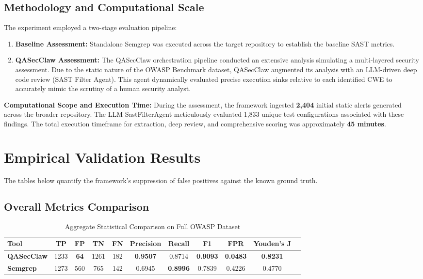\documentclass[11pt,a4paper]{article}
\begin{document}
\subsection{Methodology and Computational Scale}
The experiment employed a two-stage evaluation pipeline:
\begin{enumerate}
    \item \textbf{Baseline Assessment:} Standalone Semgrep was executed across the target repository to establish the baseline SAST metrics.
    \item \textbf{QASecClaw Assessment:} The QASecClaw orchestration pipeline conducted an extensive analysis simulating a multi-layered security assessment. Due to the static nature of the OWASP Benchmark dataset, QASecClaw augmented its analysis with an LLM-driven deep code review (SAST Filter Agent). This agent dynamically evaluated precise execution sinks relative to each identified CWE to accurately mimic the scrutiny of a human security analyst.
\end{enumerate}

\textbf{Computational Scope and Execution Time:}
During the assessment, the framework ingested \textbf{2,404} initial static alerts generated across the broader repository. The LLM SastFilterAgent meticulously evaluated 1,833 unique test configurations associated with these findings. The total execution timeframe for extraction, deep review, and comprehensive scoring was approximately \textbf{45 minutes}.

\section{Empirical Validation Results}

The tables below quantify the framework's suppression of false positives against the known ground truth.

\subsection{Overall Metrics Comparison}
\begin{table}[h]
\centering
\begin{tabular}{lcccccccccc}
\toprule
\textbf{Tool} & \textbf{TP} & \textbf{FP} & \textbf{TN} & \textbf{FN} & \textbf{Precision} & \textbf{Recall} & \textbf{F1} & \textbf{FPR} & \textbf{Youden's J} \\
\midrule
\textbf{QASecClaw} & 1233 & \textbf{64} & 1261 & 182 & \textbf{0.9507} & 0.8714 & \textbf{0.9093} & \textbf{0.0483} & \textbf{0.8231} \\
\textbf{Semgrep} & 1273 & 560 & 765 & 142 & 0.6945 & \textbf{0.8996} & 0.7839 & 0.4226 & 0.4770 \\
\bottomrule
\end{tabular}
\caption{Aggregate Statistical Comparison on Full OWASP Dataset}
\end{table}
\end{document}
